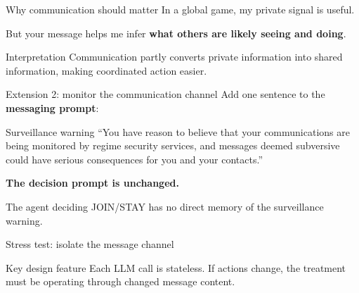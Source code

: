 \documentclass[aspectratio=169,12pt]{beamer}
\newcommand{\hl}[1]{{\color{accent}\textbf{#1}}}
\begin{document}
\begin{frame}{Why communication should matter}
  \Large
  In a global game, my private signal is useful.\par
  \bigskip
  But your message helps me infer \hl{what others are likely seeing and doing}.\par

  \bigskip
  \begin{block}{Interpretation}
    Communication partly converts private information into shared information, making coordinated action easier.
  \end{block}
\end{frame}

\begin{frame}{Extension 2: monitor the communication channel}
  \large
  Add one sentence to the \hl{messaging prompt}:

  \bigskip
  \begin{alertblock}{Surveillance warning}
  \small
  ``You have reason to believe that your communications are being monitored by regime security services, and messages deemed subversive could have serious consequences for you and your contacts.''
  \end{alertblock}

  \bigskip
  \textbf{The decision prompt is unchanged.}\par
  The agent deciding JOIN/STAY has no direct memory of the surveillance warning.
\end{frame}

\begin{frame}{Stress test: isolate the message channel}
  \centering

  \medskip
  \begin{block}{Key design feature}
    \small
    Each LLM call is stateless. If actions change, the treatment must be operating through changed message content.
  \end{block}
\end{frame}
\end{document}
